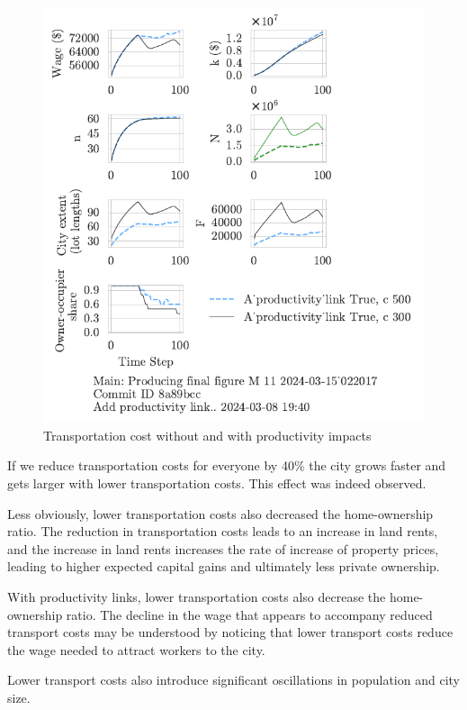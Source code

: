 \begin{figure}[h!tb]
    \includegraphics[scale=.75, trim={0 1.4cm 2.3cm 0},clip]{fig/With-productivity_link-c-15_022017.pdf} 
    \caption{Transportation cost without and with productivity impacts}
    \label{fig:Productivity_link_W-WO-transportation-cost}
\end{figure}
If we reduce transportation costs for everyone by 40\% the city grows faster and gets larger with lower transportation costs. This effect was indeed observed. 

Less obviously, lower transportation costs also decreased the home-ownership ratio. The reduction in transportation costs leads to an increase in land rents, and the increase in land rents increases the rate of increase of property prices, leading to higher expected capital gains and ultimately less private ownership. 

With productivity links, lower transportation costs also decrease the home-ownership ratio. 
The decline in the wage that appears to accompany reduced transport costs may be understood by noticing that lower transport costs reduce the wage needed to attract workers to the city. 

Lower transport costs also introduce significant oscillations in population and city size. 



